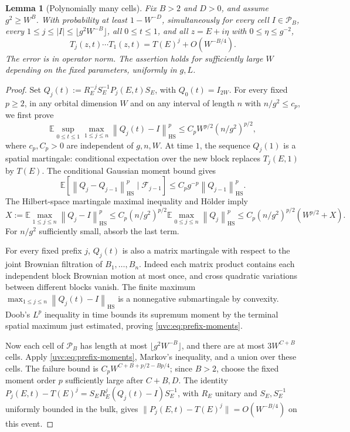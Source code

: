 \documentclass[11pt]{article}
\numberwithin{equation}{section}
\newtheorem{lemma}[theorem]{Lemma}
\theoremstyle{remark}
\newcommand{\E}{\mathbb E}
\newcommand{\norm}[1]{\left\|#1\right\|}
\begin{document}
\begin{lemma}[Polynomially many cells]\label{uvc:lem:cells}
Fix $B>2$ and $D>0$, and assume $g^2\ge W^B$.
With probability at least $1-W^{-D}$, simultaneously for every cell
$I\in\mathcal P_B$, every $1\le j\le |I|\le\lfloor g^2W^{-B}\rfloor$,
all $0\le t\le1$, and all $z=E+i\eta$ with $0\le\eta\le g^{-2}$,
\[
 T_j(z,t)\cdots T_1(z,t)=T(E)^j+O(W^{-B/4}).
\]
The error is in operator norm. The assertion holds for sufficiently
large $W$ depending on the
fixed parameters, uniformly in $g,L$.
\end{lemma}
\begin{proof}
Set $Q_j(t):=R_E^{-j}S_E^{-1}P_j(E,t)S_E$, with $Q_0(t)=I_{2W}$.
For every fixed $p\ge2$, in any orbital dimension $W$ and on any
interval of length $n$ with $n/g^2\le c_p$, we first prove
\begin{equation}\label{uvc:eq:prefix-moments}
 \E\sup_{0\le t\le1}\max_{1\le j\le n}
        \norm{Q_j(t)-I}_{\mathrm{HS}}^p
 \le C_pW^{p/2}(n/g^2)^{p/2},
\end{equation}
where $c_p,C_p>0$ are independent of $g,n,W$.
At time $1$, the sequence $Q_j(1)$ is a spatial martingale:
conditional expectation over the new block replaces $T_j(E,1)$ by
$T(E)$. The conditional Gaussian moment bound gives
\[
 \E[\norm{Q_j-Q_{j-1}}_{\mathrm{HS}}^p\mid\mathcal F_{j-1}]
 \le C_p g^{-p}\norm{Q_{j-1}}_{\mathrm{HS}}^p.
\]
The Hilbert-space martingale maximal inequality and H\"older imply
\[
 X:=\E\max_{1\le j\le n}\norm{Q_j-I}_{\mathrm{HS}}^p
 \le C_p(n/g^2)^{p/2}
       \E\max_{0\le j\le n}\norm{Q_j}_{\mathrm{HS}}^p
 \le C_p(n/g^2)^{p/2}(W^{p/2}+X).
\]
For $n/g^2$ sufficiently small, absorb the last term.

For every fixed prefix $j$, $Q_j(t)$ is also a matrix martingale
with respect to the joint Brownian filtration of $B_1,\ldots,B_n$.
Indeed each matrix product contains each independent
block Brownian motion at most once, and cross quadratic variations
between different blocks vanish. The finite maximum
$\max_{1\le j\le n}\norm{Q_j(t)-I}_{\mathrm{HS}}$ is a nonnegative
submartingale by convexity. Doob's $L^p$ inequality in time bounds its
supremum moment by the terminal spatial maximum just estimated,
proving \eqref{uvc:eq:prefix-moments}.

Now each cell of $\mathcal P_B$ has length at most
$\lfloor g^2W^{-B}\rfloor$, and there are at most $3W^{C+B}$ cells.
Apply \eqref{uvc:eq:prefix-moments}, Markov's inequality, and a union over
these cells. The failure bound is
$C_pW^{C+B+p/2-Bp/4}$; since $B>2$, choose the fixed moment order $p$
sufficiently large after $C+B,D$. The identity
$P_j(E,t)-T(E)^j=S_ER_E^j(Q_j(t)-I)S_E^{-1}$, with $R_E$ unitary
and $S_E,S_E^{-1}$ uniformly bounded in the bulk, gives
$\|P_j(E,t)-T(E)^j\|=O(W^{-B/4})$ on this event.


\end{proof}
\end{document}
